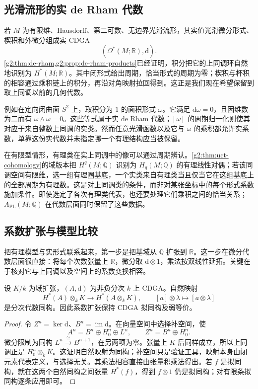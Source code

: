 \subsection{光滑流形的实 de Rham 代数}
\label{g2:subsec:E01:04}

若 \(M\) 为有限维、Hausdorff、第二可数、无边界光滑流形，其实值光滑微分形式、楔积和外微分组成实 CDGA
\[
	(\Omega^*(M;\mathbb R),\mathrm d).
\]
\cref{g2:thm:de-rham,g2:prop:de-rham-products}已经证明，积分把它的上同调环自然地识别为 \(H^*(M;\mathbb R)\)。其中闭形式给出周期，恰当形式的周期为零；楔积与杯积的相容通过乘积链上的积分，再沿对角映射拉回得到。这正是我们现在希望保留到取上同调以前的几何代数。

\ProseParagraphBreak

例如在定向闭曲面 \(S^2\) 上，取积分为 \(1\) 的面积形式 \(\omega\)。它满足 \(\mathrm d\omega=0\)，且因维数为二而有 \(\omega\wedge\omega=0\)。这些等式属于实 de Rham 代数；\([\omega]\) 的周期归一化则使其对应于来自整数上同调的实类。然而任意光滑函数以及它与 \(\omega\) 的乘积都允许实系数，单靠这份实代数并未指定哪一个有理结构应当被保留。

\ProseParagraphBreak

在有限型情形，有理类在实上同调中的像可以通过周期辨认。\cref{g2:thm:uct-cohomology}的域版本把 \(H^q(M;\mathbb Q)\) 识别为 \(H_q(M;\mathbb Q)\) 的有理线性对偶；若该同调空间有限维，选一组有理圈基底，一个实类来自有理类当且仅当它在这组基底上的全部周期为有理数。这是对上同调类的条件，而非对某张坐标中的每个形式系数施加条件。即使选定了各次有理类代表，也还要处理它们乘积之间的恰当关系；\(A_{\mathrm{PL}}(M;\mathbb Q)\) 在代数层面同时保留了这些数据。

\subsection{系数扩张与模型比较}
\label{g2:subsec:E01:05}

把有理模型与实形式联系起来，第一步是把基域从 \(\mathbb Q\) 扩张到 \(\mathbb R\)。这一步在微分代数层面很直接：将每个次数张量上 \(\mathbb R\)，微分取 \(\mathrm d\otimes1\)，乘法按双线性延拓。关键在于核对它与上同调以及空间上的系数变换相容。

\begin{proposition}\label{g2:prop:cdga-scalar-extension}
	设 \(K/k\) 为域扩张，\((A,\mathrm d)\) 为非负分次 \(k\) 上 CDGA。自然映射
	\[
		H^*(A)\otimes_kK\longrightarrow H^*(A\otimes_kK),\qquad
		[a]\otimes\lambda\longmapsto[a\otimes\lambda]
	\]
	是分次代数同构。因此系数扩张保持 CDGA 拟同构及弱等价。
\end{proposition}
\begin{proof}
	令 \(Z^n=\ker\mathrm d\)、\(B^n=\operatorname{im}\mathrm d\)。在向量空间中选择补空间，使
	\[
		A^n=B^n\oplus H_0^n\oplus L^n,\qquad Z^n=B^n\oplus H_0^n.
	\]
	微分限制为同构 \(L^n\xrightarrow{\cong}B^{n+1}\)，在另两项为零。张量上 \(K\) 后同样成立，所以上同调正是 \(H_0^n\otimes_kK\)。这证明自然映射为同构；补空间只是验证工具，映射本身由闭元素代表定义，与选择无关。其乘法相容直接由张量积乘法得出。若 \(f\) 是拟同构，就在这两个自然同构之间张量 \(H^*(f)\)，得到 \(f\otimes1\) 仍是拟同构；对有限条拟同构逐条应用即可。
\end{proof}

